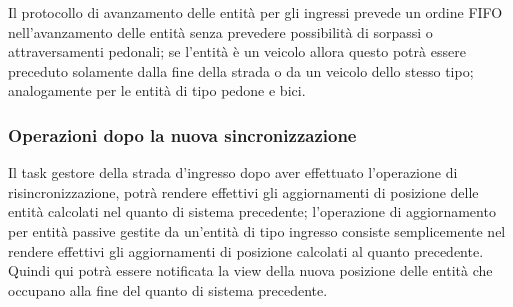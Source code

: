 Il protocollo di avanzamento delle entità per gli ingressi prevede un ordine FIFO nell'avanzamento delle entità senza prevedere possibilità di sorpassi o attraversamenti pedonali; se l'entità è un veicolo allora questo potrà essere preceduto solamente dalla fine della strada o da un veicolo dello stesso tipo; analogamente per le entità di tipo pedone e bici.
\subsubsection*{Operazioni dopo la nuova sincronizzazione} 
Il task gestore della strada d'ingresso dopo aver effettuato l'operazione di risincronizzazione, potrà rendere effettivi gli aggiornamenti di posizione delle entità calcolati nel quanto di sistema precedente; l'operazione di aggiornamento per entità passive gestite da un'entità di tipo ingresso consiste semplicemente nel rendere effettivi gli aggiornamenti di posizione calcolati al quanto precedente. Quindi qui potrà essere notificata la view della nuova posizione delle entità che occupano alla fine del quanto di sistema precedente.  
